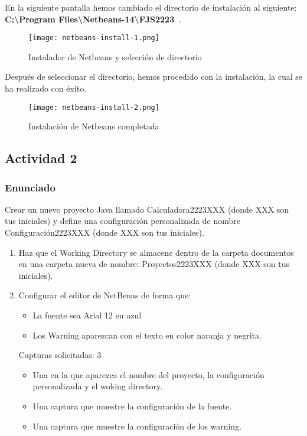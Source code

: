 \begin{enumerate}[label=(\alph*)]
     En la siguiente pantalla hemos cambiado el directorio de instalación al siguiente: \textbf{C:\textbackslash Program Files\textbackslash Netbeans-14\textbackslash FJS2223\ }.

    \begin{figure}[ht]
        \centering
        \texttt{[image: netbeans-install-1.png]}
        \caption{Instalador de Netbeans y selección de directorio}
    \end{figure}

    Después de seleccionar el directorio, hemos procedido con la instalación, la cual se ha realizado con éxito.

    \begin{figure}[ht]
        \centering
        \texttt{[image: netbeans-install-2.png]}
        \caption{Instalación de Netbeans completada}
    \end{figure}
\end{enumerate}

\subsection{Actividad 2}
\subsubsection{Enunciado}
Crear un nuevo proyecto Java llamado Calculadora2223XXX (donde XXX son tus iniciales) y define una configuración personalizada de nombre Configuración2223XXX (donde XXX son tus iniciales).

\begin{enumerate}[label=(\alph*)]
    \item Haz que el Working Directory se almacene dentro de la carpeta documentos en una carpeta nueva de nombre: Proyectos2223XXX (donde XXX son tus iniciales).

    \item Configurar el editor de NetBenas de forma que:
    \begin{itemize}
        \item La fuente sea Arial 12 en azul
        \item Los Warning aparezcan con el texto en color naranja y negrita.
    \end{itemize}

    Capturas solicitadas: 3
    \begin{itemize}
        \item Una en la que aparezca el nombre del proyecto, la configuración personalizada y el woking directory.
        \item Una captura que muestre la configuración de la fuente.
        \item Una captura que muestre la configuración de los warning.
    \end{itemize}
\end{enumerate}

